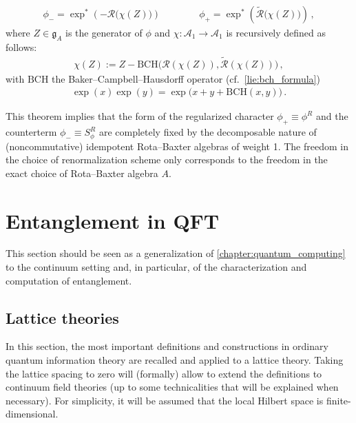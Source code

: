 \begin{theorem}
\begin{itemize}
            \begin{gather}
                \phi_- = \exp^*\left(-\mathcal{R}\bigl(\chi(Z)\bigr)\right) \qquad\qquad \phi_+ = \exp^*\left(\widetilde{\mathcal{R}}\bigl(\chi(Z)\bigr)\right)\,,
            \end{gather}
            where $Z\in\mathfrak{g}_A$ is the generator of $\phi$ and $\chi:\mathcal{A}_1\rightarrow\mathcal{A}_1$ is recursively defined as follows:
            \begin{gather}
                \chi(Z) := Z - \mathrm{BCH}\bigl(\mathcal{R}(\chi(Z)),\widetilde{\mathcal{R}}(\chi(Z))\bigr)\,,
            \end{gather}
            with $\mathrm{BCH}$ the Baker--Campbell--Hausdorff operator (cf.~\cref{lie:bch_formula})
            \begin{gather}
                \exp(x)\exp(y) = \exp\bigl(x+y+\mathrm{BCH}(x,y)\bigr)\,.
            \end{gather}
        \end{itemize}
    \end{theorem}

    This theorem implies that the form of the regularized character $\phi_+\equiv\phi^R$ and the counterterm $\phi_-\equiv S_\phi^R$ are completely fixed by the decomposable nature of (noncommutative) idempotent Rota--Baxter algebras of weight 1. The freedom in the choice of renormalization scheme only corresponds to the freedom in the exact choice of Rota--Baxter algebra $A$.


\section{Entanglement in QFT}

    This section should be seen as a generalization of \cref{chapter:quantum_computing} to the continuum setting and, in particular, of the characterization and computation of entanglement.

\subsection{Lattice theories}

    In this section, the most important definitions and constructions in ordinary quantum information theory are recalled and applied to a lattice theory. Taking the lattice spacing to zero will (formally) allow to extend the definitions to continuum field theories (up to some technicalities that will be explained when necessary). For simplicity, it will be assumed that the local Hilbert space is finite-dimensional.

